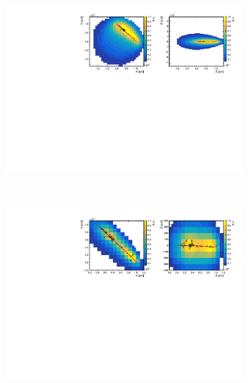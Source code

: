 \begin{figure}[b!t]
  \centering
  \begin{subfigure}[t]{0.99\textwidth}     
    \includegraphics[trim=0.1cm 0.1cm 0.0cm 0.1cm,clip=true,width=\textwidth]
      {recon/RecoResult0.pdf}
  \end{subfigure}
  ~
    \begin{subfigure}[t]{0.99\textwidth}     
    \includegraphics[trim=0.1cm 0.1cm 0.0cm 0.1cm,clip=true,width=\textwidth]
      {recon/RecoResult8.pdf}
  \end{subfigure}
  ~
  \begin{subfigure}[t]{0.99\textwidth}

\end{subfigure}
\end{figure}

